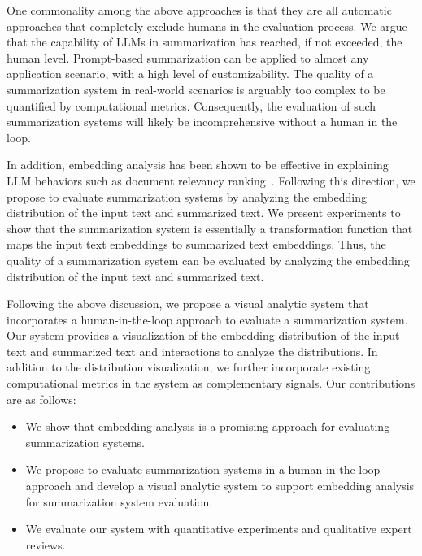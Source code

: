One commonality among the above approaches is that they are all automatic approaches that completely exclude humans in the evaluation process.
We argue that the capability of LLMs in summarization has reached, if not exceeded, the human level.
Prompt-based summarization can be applied to almost any application scenario, with a high level of customizability.
The quality of a summarization system in real-world scenarios is arguably too complex to be quantified by computational metrics.
Consequently, the evaluation of such summarization systems will likely be incomprehensive without a human in the loop.

In addition, embedding analysis has been shown to be effective in explaining LLM behaviors such as document relevancy ranking~\cite{lucchese2023can, mishra2023promptaid}.
Following this direction, we propose to evaluate summarization systems by analyzing the embedding distribution of the input text and summarized text.
We present experiments to show that the summarization system is essentially a transformation function that maps the input text embeddings to summarized text embeddings.
Thus, the quality of a summarization system can be evaluated by analyzing the embedding distribution of the input text and summarized text.

Following the above discussion, we propose a visual analytic system that incorporates a human-in-the-loop approach to evaluate a summarization system.
Our system provides a visualization of the embedding distribution of the input text and summarized text and interactions to analyze the distributions.
In addition to the distribution visualization, we further incorporate existing computational metrics in the system as complementary signals.
Our contributions are as follows:
\begin{itemize}
   \item We show that embedding analysis is a promising approach for evaluating summarization systems.
   \item We propose to evaluate summarization systems in a human-in-the-loop approach and develop a visual analytic system to support embedding analysis for summarization system evaluation.
   \item We evaluate our system with quantitative experiments and qualitative expert reviews.
\end{itemize}

